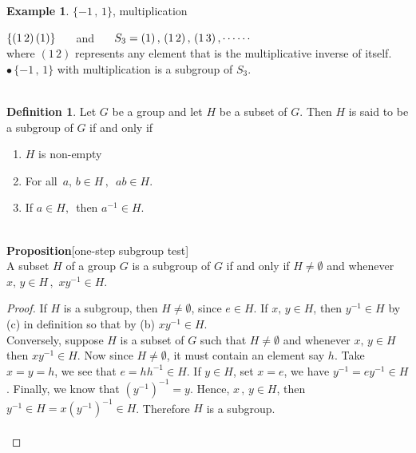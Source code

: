 \documentclass[11pt,a4paper]{article}
\theoremstyle{definition}
\newtheorem{defn}[thm]{Definition}
\newtheorem{exa}[thm]{Example}
\begin{document}
\begin{exa}
$\{-1\, ,\, 1\}$, multiplication\\
\end{exa}

$\{(1\,2)\, (1)\}\hspace{0.5cm}$ and $\hspace{0.5cm} S_3 = {(1)\, , \, (1\, 2)\, , \, (1\, 3)\,, \cdots\cdots}$\\
where $(1\,2)$ represents any element that is the multiplicative inverse of itself.\\

$\bullet \, \{-1\, , \, 1\}$ with multiplication is a subgroup of $S_3$.\\\\






\begin{defn}
Let $G$ be a group and let $H$ be a subset of $G$. Then $H$ is said to be a subgroup of $G$ if and only if
\begin{enumerate}
\item[(a)] $H$ is non-empty
\item[(b)] For all $\, a,\, b\in H\, , \,\,\, ab\in H$.
\item[(c)] If $a\in H,\,$ then $a^{-1}\in H$.\\\\
\end{enumerate}







\textbf{Proposition}[one-step subgroup test]\\
A subset $H$ of a group $G$ is a subgroup of $G$ if and only if $H\neq \emptyset$ and whenever $x,\, y\in H\, , \, \, xy^{-1}\in H$.\\
\end{defn}


\begin{proof}
If $H$ is a subgroup, then $H \neq \emptyset$, since $e\in H$. If $x,\, y\in H$, then $y^{-1}\in H$ by (c) in definition so that by (b) $xy^{-1}\in H$.\\
Conversely, suppose $H$ is a subset of $G$ such that $H\neq \emptyset$ and whenever $x,\, y\in H$ then $xy^{-1}\in H$. Now since $H\neq \emptyset$, it must contain an element say $h$. Take $x = y = h$, we see that $e = hh^{-1}\in H$. If $y\in H$, set $x= e$, we have $y^{-1} = ey^{-1}\in H$. Finally, we know that $(y^{-1})^{-1} = y$. Hence, $x\,, \, y\in H$, then $y^{-1}\in H = x(y^{-1})^{-1}\in H$. Therefore $H$ is  a subgroup.\\\\
\end{proof}
\end{document}
